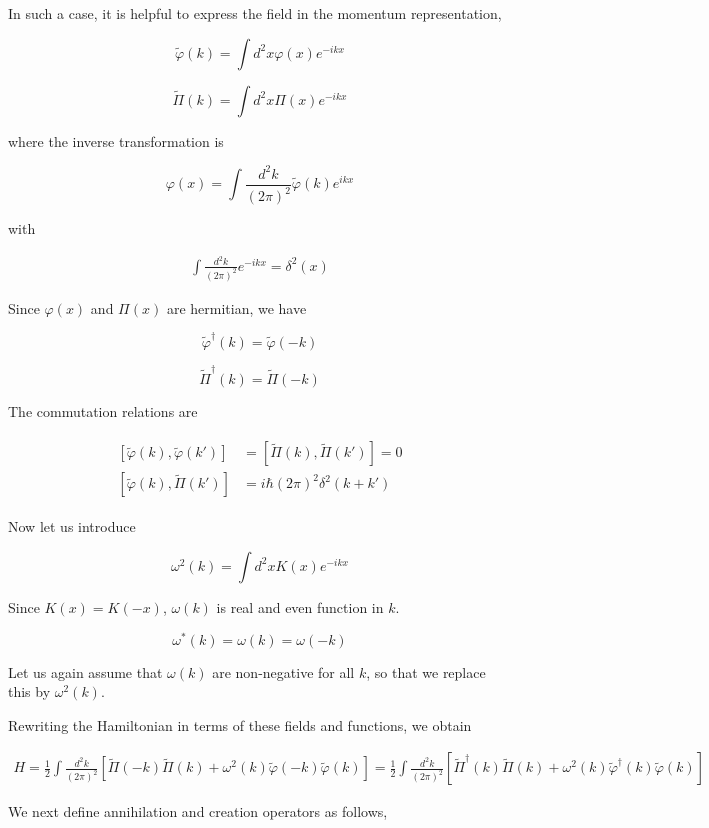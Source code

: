 In such a case, it is helpful to express the field in the momentum representation, 

\[\tilde{\varphi}(k) = \int d^2 x\varphi(x)e^{-ikx} \]

\[\tilde{\Pi}(k) = \int d^2 x \Pi(x) e^{-ikx} \]

where the inverse transformation is 

\[\varphi(x) = \int\frac{d^2 k}{(2\pi)^2} \tilde{\varphi}(k)e^{ikx} \]

with

\begin{align}
\int \frac{d^2 k}{(2\pi)^2}e^{-ikx} = \delta^2(x)
\end{align}

Since $\varphi(x)$ and $\Pi(x)$ are hermitian, we have

\[\tilde{\varphi}^\dagger(k) = \tilde{\varphi}(-k) \]

\[\tilde{\Pi}^\dagger(k) = \tilde{\Pi}(-k) \]

The commutation relations are

\begin{align}\label{1.4.6}
\begin{split}
[\tilde{\varphi}(k), \tilde{\varphi}(k')] &= [\tilde{\Pi}(k), \tilde{\Pi}(k')] = 0\\
[\tilde{\varphi}(k),\tilde{\Pi}(k')] &= i\hbar(2\pi)^2\delta^2(k+k')
\end{split}
\end{align}

Now let us introduce 

\[\omega^2(k) = \int d^2x K(x)e^{-ikx} \]

Since $K(x) = K(-x)$, $\omega(k)$ is real and even function in $k$. 

\[\omega^*(k) = \omega(k) = \omega(-k) \]

Let us again assume that $\omega(k)$ are non-negative for all $k$, so that we replace this by $\omega^2(k)$. 

Rewriting the Hamiltonian in terms of these fields and functions, we obtain

\begin{align}
H = \frac{1}{2}\int\frac{d^2 k}{(2\pi)^2}\left[\tilde{\Pi}(-k)\tilde{\Pi}(k)+\omega^2(k)\tilde{\varphi}(-k)\tilde{\varphi}(k)\right] = \frac{1}{2}\int\frac{d^2 k}{(2\pi)^2}\left[\tilde{\Pi}^\dagger (k)\tilde{\Pi}(k)+\omega^2(k)\tilde{\varphi}^\dagger(k)\tilde{\varphi}(k)\right]
\end{align}

We next define annihilation and creation operators as follows, 


